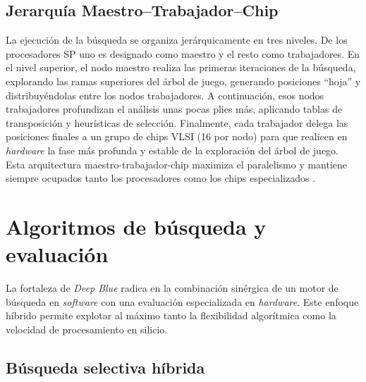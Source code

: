\documentclass[a4paper, 12pt]{article}
\begin{document}
\subsection{Jerarquía Maestro--Trabajador--Chip}


La ejecución de la búsqueda se organiza jerárquicamente en tres 
niveles. De los procesadores SP uno es designado como maestro y el resto como trabajadores.
En el nivel superior, el nodo maestro realiza las 
primeras iteraciones de la búsqueda, explorando las ramas superiores del árbol de juego, 
generando posiciones 
“hoja” y distribuyéndolas entre los nodos trabajadores. 
A continuación, esos nodos trabajadores profundizan 
el análisis unas pocas plies más, aplicando tablas de 
transposición y heurísticas de selección. Finalmente, cada 
trabajador delega las posiciones finales a un grupo de chips 
VLSI (16 por nodo) para que realicen en \emph{hardware} la fase más 
profunda y estable de la exploración del árbol de juego. 
Esta arquitectura maestro-trabajador-chip 
maximiza el paralelismo y mantiene siempre ocupados tanto los 
procesadores como los chips especializados \cite{campbell2002deep, hsu1999ibm}.










\section{Algoritmos de búsqueda y evaluación}

La fortaleza de \textit{Deep Blue} radica en la combinación 
sinérgica de un motor de búsqueda en \emph{software} con una evaluación 
especializada en \emph{hardware}. Este enfoque híbrido permite 
explotar al máximo tanto la flexibilidad algorítmica como la 
velocidad de procesamiento en silicio.

\subsection{Búsqueda selectiva híbrida}
\end{document}
